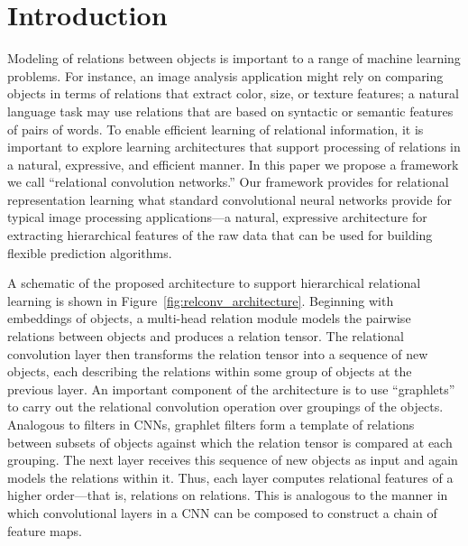 \section{Introduction}\label{sec:intro}

Modeling of relations between objects is important to a range of machine learning problems. For instance, an image analysis application might rely on comparing objects in terms of relations that extract color, size, or texture features; a natural language task may use relations that are based on syntactic or semantic features of pairs of words. %
To enable efficient learning of relational information, it is important to explore learning architectures that support processing of relations in a natural, expressive, and efficient manner. In this paper we propose a framework we call ``relational convolution networks.'' Our framework provides for relational representation learning what standard convolutional neural networks provide for typical image processing applications---a natural, expressive architecture for extracting hierarchical features of the raw data that can be used for building flexible prediction algorithms.

A schematic of the proposed architecture to support hierarchical relational learning is shown in Figure~\ref{fig:relconv_architecture}. Beginning with embeddings of objects, a multi-head relation module models the pairwise relations between objects and produces a relation tensor. The relational convolution layer then transforms the relation tensor into a sequence of new objects, each describing the relations within some group of objects at the previous layer.  An important component of the architecture is to use ``graphlets'' to carry out the relational convolution operation over groupings of the objects. Analogous to filters in CNNs, graphlet filters form a template of relations between subsets of objects against which the relation tensor is compared at each grouping. The next layer receives this sequence of new objects as input and again models the relations within it. Thus, each layer computes relational features of a higher order---that is, relations on relations. This is analogous to the manner in which convolutional layers in a CNN can be composed to construct a chain of feature maps.

